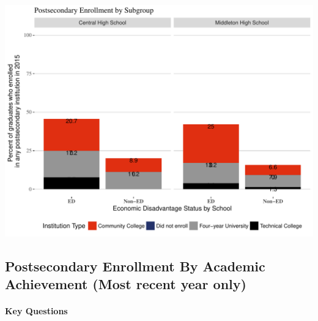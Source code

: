 \documentclass[11pt,]{article}
\let\oldparagraph\paragraph
\renewcommand{\paragraph}[1]{\oldparagraph{#1}\mbox{}}
\begin{document}
\includegraphics{20170411_PSWRR_no_CTE_files/figure-latex/Figure5c-1.pdf}

\newpage

\subsection{Postsecondary Enrollment By Academic Achievement (Most
recent year
only)}\label{postsecondary-enrollment-by-academic-achievement-most-recent-year-only}

\paragraph{Key Questions}\label{key-questions-3}
\end{document}
